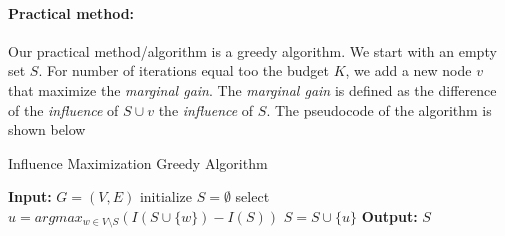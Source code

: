 







\paragraph{Practical method:} Our practical method/algorithm is a greedy algorithm. We start with an empty set $S$. For number of iterations equal too the budget $K$, we add a new node $v$ that maximize the \emph{marginal gain}. The \emph{marginal gain} is defined as the difference of the \emph{influence} of $S \cup v$ the \emph{influence} of $S$. The pseudocode  of the algorithm is shown below

\begin{algorithm}
\caption{Influence Maximization Greedy Algorithm}\label{alg:euclid}
\begin{algorithmic}[1]
\State \textbf{Input:} $G=(V,E)$
\State initialize $S = \emptyset$
	\State select $u=argmax_{w\in V\setminus S}\left(I(S \cup \{w\}) - I(S)  \right)$
	\State $S = S \cup \{u\}$
\EndFor
\State \textbf{Output:} $S$
\end{algorithmic}
\end{algorithm}

